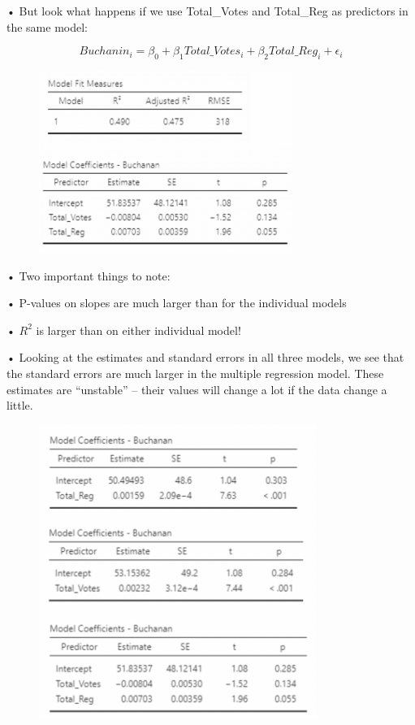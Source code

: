 \documentclass[
  letterpaper,
  DIV=11,
  numbers=noendperiod]{scrreprt}
\begin{document}
• But look what happens if we use Total\_Votes and Total\_Reg as
predictors in the same model:

\[
Buchanin_i = \beta_0 + \beta_1Total\_Votes_i + \beta_2Total\_Reg_i + \epsilon_i
\]

\begin{figure}

\includegraphics[width=3.25in,height=\textheight]{images/mod4_pt1_27-01.png} \hfill{}

\end{figure}

• Two important things to note:

• P-values on slopes are much larger than for the individual models

• \(R^2\) is larger than on either individual model!

• Looking at the estimates and standard errors in all three models, we
see that the standard errors are much larger in the multiple regression
model. These estimates are ``unstable'' -- their values will change a
lot if the data change a little.

\begin{figure}

\includegraphics[width=3.55208in,height=\textheight]{images/mod4_pt1_28.png} \hfill{}

\end{figure}
\end{document}
